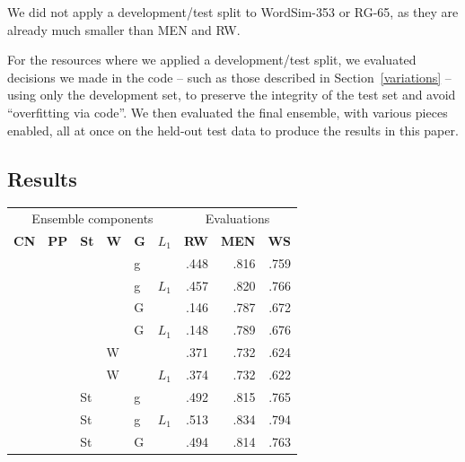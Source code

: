 \documentclass[11pt,letterpaper]{article}
\begin{document}
We did not apply a development/test split to WordSim-353 or RG-65, as they are
already much smaller than MEN and RW.

For the resources where we applied a development/test split, we evaluated
decisions we made in the code -- such as those described in
Section~\ref{variations} -- using only the development set, to preserve the
integrity of the test set and avoid ``overfitting via code''. We then evaluated
the final ensemble, with various pieces enabled, all at once on the held-out
test data to produce the results in this paper.

\subsection{Results}

\begin{table}[t]
\centering
\footnotesize
\begin{tabular}{llllll|rrr}
\toprule
\multicolumn{6}{c|}{Ensemble components} & \multicolumn{3}{c}{Evaluations} \\
\bf CN&\bf PP&\bf St&\bf W& \bf G& $L_1$  & \bf RW  & \bf MEN & \bf  WS \\
\midrule
     &      &      &      & g    &        &    .448 &    .816 &    .759 \\  %
     &      &      &      & g    & $L_1$  &    .457 &    .820 &    .766 \\  %
     &      &      &      & G    &        &    .146 &    .787 &    .672 \\  %
     &      &      &      & G    & $L_1$  &    .148 &    .789 &    .676 \\  %
     &      &      & W    &      &        &    .371 &    .732 &    .624 \\  %
     &      &      & W    &      & $L_1$  &    .374 &    .732 &    .622 \\  %
\midrule
     &      & St   &      & g    &        &    .492 &    .815 &    .765 \\  %
     &      & St   &      & g    & $L_1$  &    .513 &    .834 &    .794 \\  %
     &      & St   &      & G    &        &    .494 &    .814 &    .763 \\  %

\end{tabular}
\end{table}
\end{document}
